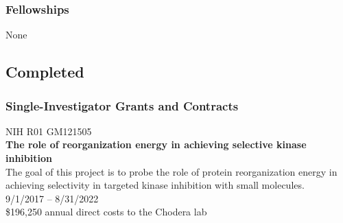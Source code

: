 \documentclass[10pt]{article}
\begin{document}
%
%
%

\subsubsection*{Fellowships}

None

\eject

\subsection*{Completed}

\subsubsection*{Single-Investigator Grants and Contracts}

NIH R01 GM121505 \\
{\bf The role of reorganization energy in achieving selective kinase inhibition} \\
The goal of this project is to probe the role of protein reorganization energy in achieving selectivity in targeted kinase inhibition with small molecules. \\
9/1/2017 -- 8/31/2022 \\
\$196,250 annual direct costs to the Chodera lab
\end{document}
